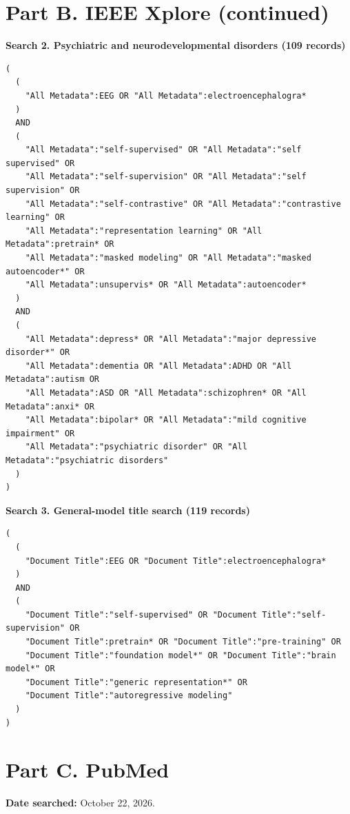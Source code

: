 \documentclass[11pt,letterpaper]{article}
\begin{document}
\clearpage
\section*{Part B. IEEE Xplore (continued)}
\textbf{Search 2. Psychiatric and neurodevelopmental disorders (109 records)}
\begin{Verbatim}[fontsize=\fontsize{8.5}{10}\selectfont,breaklines=true,breakanywhere=false,breaksymbolleft={},breaksymbolright={},frame=single,framesep=6pt]
(
  (
    "All Metadata":EEG OR "All Metadata":electroencephalogra*
  )
  AND
  (
    "All Metadata":"self-supervised" OR "All Metadata":"self supervised" OR
    "All Metadata":"self-supervision" OR "All Metadata":"self supervision" OR
    "All Metadata":"self-contrastive" OR "All Metadata":"contrastive learning" OR
    "All Metadata":"representation learning" OR "All Metadata":pretrain* OR
    "All Metadata":"masked modeling" OR "All Metadata":"masked autoencoder*" OR
    "All Metadata":unsupervis* OR "All Metadata":autoencoder*
  )
  AND
  (
    "All Metadata":depress* OR "All Metadata":"major depressive disorder*" OR
    "All Metadata":dementia OR "All Metadata":ADHD OR "All Metadata":autism OR
    "All Metadata":ASD OR "All Metadata":schizophren* OR "All Metadata":anxi* OR
    "All Metadata":bipolar* OR "All Metadata":"mild cognitive impairment" OR
    "All Metadata":"psychiatric disorder" OR "All Metadata":"psychiatric disorders"
  )
)
\end{Verbatim}

\medskip
\textbf{Search 3. General-model title search (119 records)}
\begin{Verbatim}[fontsize=\fontsize{8.5}{10}\selectfont,breaklines=true,breakanywhere=false,breaksymbolleft={},breaksymbolright={},frame=single,framesep=6pt]
(
  (
    "Document Title":EEG OR "Document Title":electroencephalogra*
  )
  AND
  (
    "Document Title":"self-supervised" OR "Document Title":"self-supervision" OR
    "Document Title":pretrain* OR "Document Title":"pre-training" OR
    "Document Title":"foundation model*" OR "Document Title":"brain model*" OR
    "Document Title":"generic representation*" OR
    "Document Title":"autoregressive modeling"
  )
)
\end{Verbatim}

\clearpage
\section*{Part C. PubMed}
\textbf{Date searched:} October 22, 2026.
\end{document}

